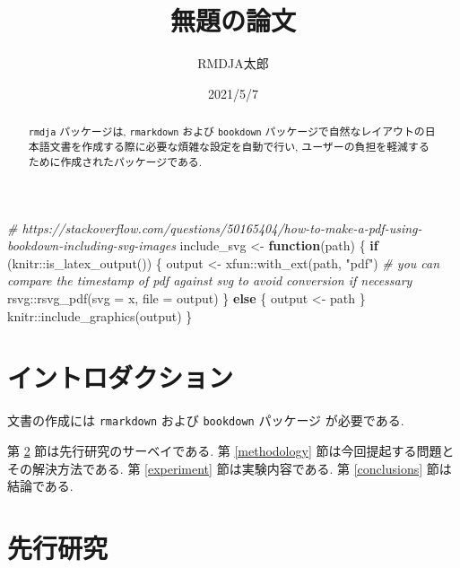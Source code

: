 \documentclass[
  a4paper,
  number-of-lines=30,
  textwidth=40zw]{bxjsarticle}
\title{無題の論文}
\author{RMDJA太郎}
\date{2021/5/7}
\newenvironment{Shaded}{\begin{snugshade}}{\end{snugshade}}
\newcommand{\AttributeTok}[1]{\textcolor[rgb]{0.77,0.63,0.00}{#1}}
\newcommand{\CommentTok}[1]{\textcolor[rgb]{0.56,0.35,0.01}{\textit{#1}}}
\newcommand{\ControlFlowTok}[1]{\textcolor[rgb]{0.13,0.29,0.53}{\textbf{#1}}}
\newcommand{\FunctionTok}[1]{\textcolor[rgb]{0.00,0.00,0.00}{#1}}
\newcommand{\NormalTok}[1]{#1}
\newcommand{\OtherTok}[1]{\textcolor[rgb]{0.56,0.35,0.01}{#1}}
\newcommand{\SpecialCharTok}[1]{\textcolor[rgb]{0.00,0.00,0.00}{#1}}
\newcommand{\StringTok}[1]{\textcolor[rgb]{0.31,0.60,0.02}{#1}}
\begin{document}
\maketitle
\begin{abstract}
\texttt{rmdja} パッケージは, \texttt{rmarkdown} および \texttt{bookdown} パッケージで自然なレイアウトの日本語文書を作成する際に必要な煩雑な設定を自動で行い, ユーザーの負担を軽減するために作成されたパッケージである.
\end{abstract}

\newpage

\begin{Shaded}
\begin{Highlighting}[numbers=left,,]
\CommentTok{\# https://stackoverflow.com/questions/50165404/how{-}to{-}make{-}a{-}pdf{-}using{-}bookdown{-}including{-}svg{-}images}
\NormalTok{include\_svg }\OtherTok{\textless{}{-}} \ControlFlowTok{function}\NormalTok{(path) \{}
  \ControlFlowTok{if}\NormalTok{ (knitr}\SpecialCharTok{::}\FunctionTok{is\_latex\_output}\NormalTok{()) \{}
\NormalTok{    output }\OtherTok{\textless{}{-}}\NormalTok{ xfun}\SpecialCharTok{::}\FunctionTok{with\_ext}\NormalTok{(path, }\StringTok{"pdf"}\NormalTok{)}
    \CommentTok{\# you can compare the timestamp of pdf against svg to avoid conversion if necessary}
\NormalTok{    rsvg}\SpecialCharTok{::}\FunctionTok{rsvg\_pdf}\NormalTok{(}\AttributeTok{svg =}\NormalTok{ x, }\AttributeTok{file =}\NormalTok{ output)}
\NormalTok{  \} }\ControlFlowTok{else}\NormalTok{ \{}
\NormalTok{    output }\OtherTok{\textless{}{-}}\NormalTok{ path}
\NormalTok{  \}}
\NormalTok{  knitr}\SpecialCharTok{::}\FunctionTok{include\_graphics}\NormalTok{(output)}
\NormalTok{\}}
\end{Highlighting}
\end{Shaded}

\hypertarget{introduction}{%
\section{イントロダクション}\label{introduction}}

文書の作成には \texttt{rmarkdown} および \texttt{bookdown} パッケージ \autocite{R-rmarkdown,R-bookdown} が必要である.

第 \ref{related-works} 節は先行研究のサーベイである.
第 \ref{methodology} 節は今回提起する問題とその解決方法である.
第 \ref{experiment} 節は実験内容である.
第 \ref{conclusions} 節は結論である.

\hypertarget{related-works}{%
\section{先行研究}\label{related-works}}
\end{document}
